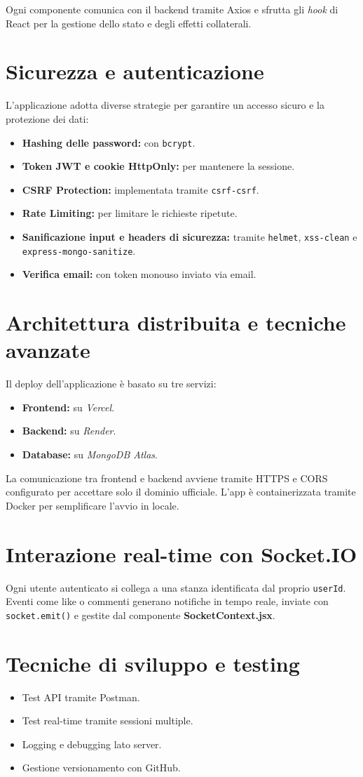 \documentclass[a4paper,12pt]{article}
\begin{document}
Ogni componente comunica con il backend tramite Axios e sfrutta gli \textit{hook} di React per la gestione dello stato e degli effetti collaterali.

\section{Sicurezza e autenticazione}
L’applicazione adotta diverse strategie per garantire un accesso sicuro e la protezione dei dati:
\begin{itemize}
    \item \textbf{Hashing delle password:} con \texttt{bcrypt}.
    \item \textbf{Token JWT e cookie HttpOnly:} per mantenere la sessione.
    \item \textbf{CSRF Protection:} implementata tramite \texttt{csrf-csrf}.
    \item \textbf{Rate Limiting:} per limitare le richieste ripetute.
    \item \textbf{Sanificazione input e headers di sicurezza:} tramite \texttt{helmet}, \texttt{xss-clean} e \texttt{express-mongo-sanitize}.
    \item \textbf{Verifica email:} con token monouso inviato via email.
\end{itemize}

\section{Architettura distribuita e tecniche avanzate}
Il deploy dell’applicazione è basato su tre servizi:
\begin{itemize}
    \item \textbf{Frontend:} su \textit{Vercel}.
    \item \textbf{Backend:} su \textit{Render}.
    \item \textbf{Database:} su \textit{MongoDB Atlas}.
\end{itemize}
La comunicazione tra frontend e backend avviene tramite HTTPS e CORS configurato per accettare solo il dominio ufficiale.  
L’app è containerizzata tramite Docker per semplificare l’avvio in locale.

\section{Interazione real-time con Socket.IO}
Ogni utente autenticato si collega a una stanza identificata dal proprio \texttt{userId}.  
Eventi come like o commenti generano notifiche in tempo reale, inviate con \texttt{socket.emit()} e gestite dal componente \textbf{SocketContext.jsx}.



\section{Tecniche di sviluppo e testing}
\begin{itemize}
    \item Test API tramite Postman.
    \item Test real-time tramite sessioni multiple.
    \item Logging e debugging lato server.
    \item Gestione versionamento con GitHub.
\end{itemize}
\end{document}
